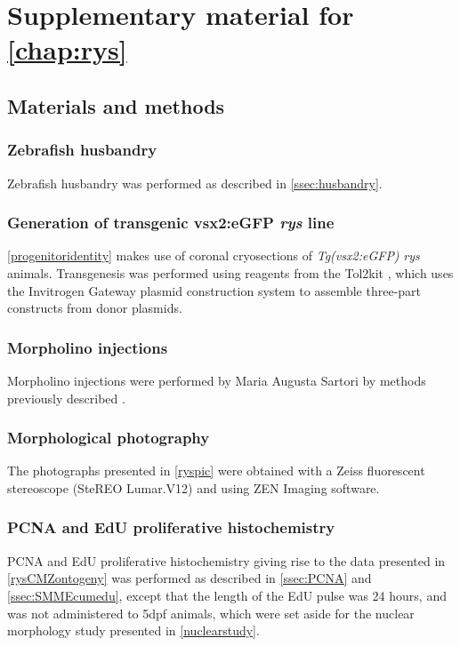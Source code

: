 \chapter{Supplementary material for \autoref{chap:rys}}
\section{Materials and methods}
\subsection{Zebrafish husbandry}
Zebrafish husbandry was performed as described in \autoref{ssec:husbandry}.

\subsection{Generation of transgenic vsx2:eGFP \textit{rys} line}
\autoref{progenitoridentity} makes use of coronal cryosections of \textit{Tg(vsx2:eGFP)} \textit{rys} animals. Transgenesis was performed using reagents from the Tol2kit \cite{Kwan2007}, which uses the Invitrogen Gateway plasmid construction system to assemble three-part constructs from donor plasmids. 

\subsection{Morpholino injections}
Morpholino injections were performed by Maria Augusta Sartori by methods previously described \cite{Wong2015}.
 
\subsection{Morphological photography}
The photographs presented in \autoref{ryspic} were obtained with a Zeiss fluorescent stereoscope (SteREO Lumar.V12) and using ZEN Imaging software.

\subsection{PCNA and EdU proliferative histochemistry}
PCNA and EdU proliferative histochemistry giving rise to the data presented in \autoref{rysCMZontogeny} was performed as described in \autoref{ssec:PCNA} and \autoref{ssec:SMMEcumedu}, except that the length of the EdU pulse was 24 hours, and was not administered to 5dpf animals, which were set aside for the nuclear morphology study presented in \autoref{nuclearstudy}.

